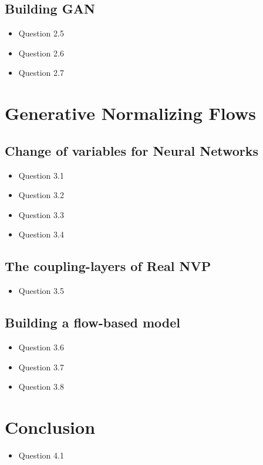 \documentclass{article}
\begin{document}
    \subsection{Building GAN}
      \begin{itemize}
        \item Question 2.5
        \item Question 2.6
        \item Question 2.7
      \end{itemize}
  \section{Generative Normalizing Flows}
      \subsection{Change of variables for Neural Networks}
        \begin{itemize}
          \item Question 3.1
          \item Question 3.2
          \item Question 3.3
          \item Question 3.4
        \end{itemize}
      \subsection{The coupling-layers of Real NVP}
        \begin{itemize}
          \item Question 3.5
        \end{itemize}
      \subsection{Building a flow-based model}
        \begin{itemize}
          \item Question 3.6
          \item Question 3.7
          \item Question 3.8
        \end{itemize}
  \section{Conclusion}
        \begin{itemize}
          \item Question 4.1
        \end{itemize}
    
\end{document}
